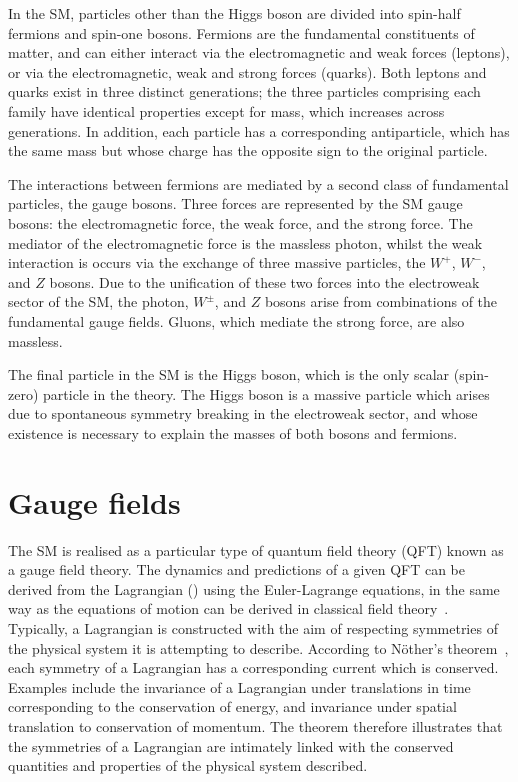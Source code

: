 In the SM, particles other than the Higgs boson are divided into spin-half fermions
and spin-one bosons.
Fermions are the fundamental constituents of matter, 
and can either interact via the electromagnetic and weak forces (leptons), 
or via the electromagnetic, weak and strong forces (quarks).
Both leptons and quarks exist in three distinct generations;
the three particles comprising each family have identical properties 
except for mass, which increases across generations.
In addition, each particle has a corresponding antiparticle, 
which has the same mass but whose charge has the opposite sign to the original particle.


The interactions between fermions are mediated by a second class of fundamental particles, 
the gauge bosons.
Three forces are represented by the SM gauge bosons: 
the electromagnetic force, the weak force, and the strong force.
The mediator of the electromagnetic force is the massless photon, 
whilst the weak interaction is occurs via the exchange of three massive particles, 
the $W^+$, $W^-$, and $Z$ bosons.
Due to the unification of these two forces into the electroweak sector of the SM, 
the photon, $W^\pm$, and $Z$ bosons arise from combinations of the fundamental gauge fields.
Gluons, which mediate the strong force, 
are also massless.


The final particle in the SM is the Higgs boson, 
which is the only scalar (spin-zero) particle in the theory.
The Higgs boson is a massive particle which arises 
due to spontaneous symmetry breaking in the electroweak sector, 
and whose existence is necessary to explain the masses of both bosons and fermions.

\section{Gauge fields}

The SM is realised as a particular type of quantum field theory (QFT) known as a gauge field theory.
The dynamics and predictions of a given QFT can be derived from the Lagrangian (\Like)
using the Euler-Lagrange equations, 
in the same way as the equations of motion can be derived in classical field theory~\cite{Peskin}.
Typically, a Lagrangian is constructed with the aim of respecting symmetries of the physical system
it is attempting to describe.
According to N\"other's theorem~\cite{Nother}, 
each symmetry of a Lagrangian has a corresponding current which is conserved.
Examples include the invariance of a Lagrangian under translations in time 
corresponding to the conservation of energy, 
and invariance under spatial translation to conservation of momentum.
The theorem therefore illustrates that the symmetries of a Lagrangian 
are intimately linked with the conserved quantities and properties of the physical system described.

